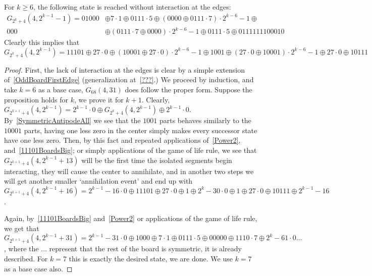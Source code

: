 \documentclass[12pt,letterpaper]{article}
\begin{document}
\begin{prop}\label{1111BoardsBig}
  For $k\geq 6$, the following state is reached without interaction at the edges:
  \begin{align*}
    G_{2^k+4}(4, 2^{k-1}-1)=01000 &\oplus 7\cdot 1\oplus 0111\cdot 5\oplus (0000 \oplus 0111\cdot 7)\cdot 2^{k-6}-1\oplus \\
    000 &\oplus (0111\cdot 7\oplus 0000) \cdot 2^{k-6}-1\oplus 0111\cdot 5\oplus 0111111100010
  \end{align*}
  Clearly this implies that $$G_{2^k+4}(4, 2^{k-1}) = 11101\oplus 27\cdot 0\oplus (10001\oplus 27\cdot 0)\cdot 2^{k-6}-1\oplus 1001\oplus (27\cdot 0\oplus 10001)\cdot 2^{k-6}-1\oplus 27\cdot 0\oplus 10111$$
\end{prop}
\begin{proof}
  First, the lack of interaction at the edges is clear by a simple extension of~\cref{OddBoardFirstEdge} (generalization at~\cref{???}.) We proceed by induction, and take $k=6$ as a base case, $G_{68}(4, 31)$ does follow the proper form. Suppose the proposition holds for $k$, we prove it for $k+1$. Clearly, $G_{2^{k+1}+4}(4,2^{k-1})=2^{k-1}\cdot 0\oplus G_{2^k+4}(4,2^{k-1})\oplus 2^{k-1}\cdot 0$. By~\cref{SymmetricAntipodeAll} we see that the $1001$ parts behaves similarly to the $10001$ parts, having one less zero in the center simply makes every successor state have one less zero. Then, by this fact and repeated applications of~\cref{Power2}, and~\cref{11101BoardsBig}; or simply applications of the game of life rule, we see that $G_{2^{k+1}+4}(4,2^{k-1}+13)$ will be the first time the isolated segments begin interacting, they will cause the center to annihilate, and in another two steps we will get another smaller `annihilation event' and end up with $G_{2^{k+1}+4}(4,2^{k-1}+16)=2^{k-1}-16\cdot 0\oplus 11101\oplus 27\cdot 0\oplus 1\oplus 2^k-30\cdot 0\oplus 1\oplus 27\cdot 0\oplus 10111\oplus 2^{k-1}-16$.

  Again, by~\cref{11101BoardsBig} and~\cref{Power2} or applications of the game of life rule, we get that $G_{2^{k+1}+4}(4,2^{k-1}+31)=2^{k-1}-31\cdot 0 \oplus 1000\oplus 7\cdot 1\oplus 0111\cdot 5\oplus 00000\oplus 1110\cdot 7\oplus 2^k-61\cdot 0\dots$, where the $\dots$ represent that the rest of the board is symmetric, it is already described. For $k=7$ this is exactly the desired state, we are done. We use $k=7$ as a base case also.


\end{proof}
\end{document}
